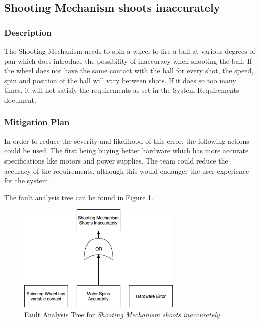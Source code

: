 \documentclass[11pt]{article}
\begin{document}
\subsection{Shooting Mechanism shoots inaccurately}
\subsubsection*{Description}
The Shooting Mechanism needs to spin a wheel to fire a ball at various degrees of pan which does introduce the possibility of inaccuracy when shooting the ball. If the wheel does not have the same contact with the ball for every shot, the speed, spin and position of the ball will vary between shots. If it does so too many times, it will not satisfy the requirements as set in the System Requirements document.
\subsubsection*{Mitigation Plan}
In order to reduce the severity and likelihood of this error, the following actions could be used. The first being buying better hardware which has more accurate specifications like motors and power supplies. The team could reduce the accuracy of the requirements, although this would endanger the user experience for the system. 

The fault analysis tree can be found in Figure \ref{fig:ft-shooting}.

\begin{figure}[H]
   \centering
   \includegraphics[width=0.7\textwidth]{img/ft-shooting.png} %
   \caption{Fault Analysis Tree for \textit{Shooting Mechanism shoots inaccurately}}
   \label{fig:ft-shooting}
\end{figure}
\end{document}
